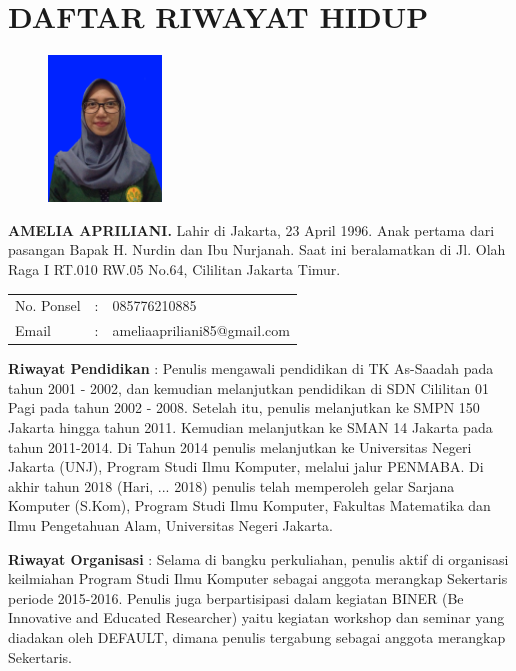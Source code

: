 \pagestyle{empty}
\chapter*{\centering \large DAFTAR RIWAYAT HIDUP}
\thispagestyle{empty}

\begin{figure}
	\vspace{-25pt}
	\begin{center}
		\includegraphics[width=0.27\textwidth]{gambar/pas-foto}
	\end{center}
	\vspace{-80pt}
\end{figure}

\noindent \textbf{AMELIA APRILIANI.}  Lahir di Jakarta, 23 April 1996.  Anak pertama dari pasangan Bapak H. Nurdin dan Ibu Nurjanah. Saat ini beralamatkan di Jl. Olah Raga I RT.010 RW.05 No.64, Cililitan Jakarta Timur.

\vspace{0.5cm}
\noindent
\begin{center}
	\begin{flushright}
		\begin{tabular}{lcl}
			No. Ponsel	& :&  085776210885 \\
			Email	& :&  ameliaapriliani85@gmail.com
		\end{tabular}
	\end{flushright}
\end{center}
\vspace{0.5cm}

\noindent \textbf{Riwayat Pendidikan} : Penulis mengawali pendidikan di TK As-Saadah pada tahun 2001 - 2002, dan kemudian melanjutkan pendidikan di SDN Cililitan 01 Pagi pada tahun 2002 - 2008. Setelah itu, penulis melanjutkan ke SMPN 150 Jakarta hingga tahun 2011. Kemudian melanjutkan ke SMAN 14 Jakarta pada tahun 2011-2014. Di Tahun 2014 penulis melanjutkan ke Universitas Negeri Jakarta (UNJ), Program Studi Ilmu Komputer, melalui jalur PENMABA. Di akhir tahun 2018 (Hari, ... 2018) penulis telah memperoleh gelar Sarjana Komputer (S.Kom), Program Studi Ilmu Komputer, Fakultas Matematika dan Ilmu Pengetahuan Alam, Universitas Negeri Jakarta.

\noindent \textbf{Riwayat Organisasi} : Selama di bangku perkuliahan, penulis aktif di organisasi keilmiahan Program Studi Ilmu Komputer sebagai anggota merangkap Sekertaris periode 2015-2016. Penulis juga berpartisipasi dalam kegiatan BINER (Be Innovative and Educated Researcher) yaitu kegiatan workshop dan seminar yang diadakan oleh DEFAULT, dimana penulis tergabung sebagai anggota merangkap Sekertaris. 